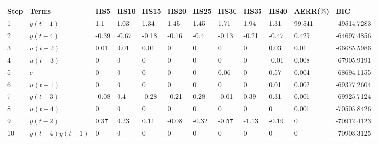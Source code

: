 \begin{tabular}{llllllllllll}
Step & Terms & HS5 & HS10 & HS15 & HS20 & HS25 & HS30 & HS35 & HS40 & AERR($\%$) & BIC \\ 
\hline 
1 & $y(t-1)$ & 1.1 & 1.03 & 1.34 & 1.45 & 1.45 & 1.71 & 1.94 & 1.31 & 99.541 & -49514.7283 \\ 
2 & $y(t-4)$ & -0.39 & -0.67 & -0.18 & -0.16 & -0.4 & -0.13 & -0.21 & -0.47 & 0.429 & -64697.4856 \\ 
3 & $u(t-2)$ & 0.01 & 0.01 & 0.01 & 0 & 0 & 0 & 0 & 0.03 & 0.01 & -66685.5986 \\ 
4 & $u(t-3)$ & 0 & 0 & 0 & 0 & 0 & 0 & 0 & -0.01 & 0.008 & -67905.9191 \\ 
5 & $c$ & 0 & 0 & 0 & 0 & 0 & 0.06 & 0 & 0.57 & 0.004 & -68694.1155 \\ 
6 & $u(t-1)$ & 0 & 0 & 0 & 0 & 0 & 0 & 0 & 0.01 & 0.002 & -69377.2604 \\ 
7 & $y(t-3)$ & -0.08 & 0.4 & -0.28 & -0.21 & 0.28 & -0.01 & 0.39 & 0.31 & 0.001 & -69925.7124 \\ 
8 & $u(t-4)$ & 0 & 0 & 0 & 0 & 0 & 0 & 0 & 0 & 0.001 & -70505.8426 \\ 
9 & $y(t-2)$ & 0.37 & 0.23 & 0.11 & -0.08 & -0.32 & -0.57 & -1.13 & -0.19 & 0 & -70912.4123 \\ 
10 & $y(t-4)y(t-1)$ & 0 & 0 & 0 & 0 & 0 & 0 & 0 & 0 & 0 & -70908.3125 \\ 
\hline 
\end{tabular}
